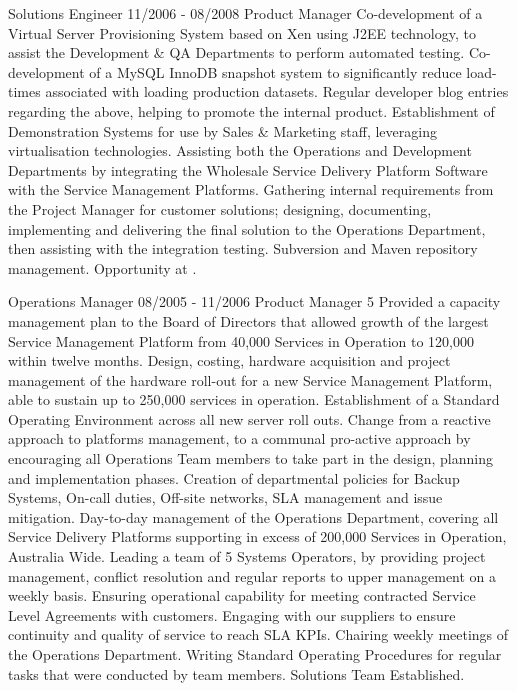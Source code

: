 \lskip
{} Solutions Engineer
 11/2006 - 08/2008
 Product Manager
 Co-development of a Virtual Server Provisioning System based on Xen using J2EE technology, to assist the Development \& QA Departments to perform automated testing.
\dashtopic Co-development of a MySQL InnoDB snapshot system to significantly reduce load-times associated with loading production datasets.
\dashtopic Regular developer blog entries regarding the above, helping to promote the internal product.
\dashtopic Establishment of Demonstration Systems for use by Sales \& Marketing staff, leveraging virtualisation technologies.
 Assisting both the Operations and Development Departments by integrating the Wholesale Service Delivery Platform Software with the Service Management Platforms.
\dashtopic Gathering internal requirements from the Project Manager for customer solutions; designing, documenting, implementing and delivering the final solution to the Operations Department, then assisting with the integration testing.
\dashtopic Subversion and Maven repository management.
 Opportunity at \ATL.
\pskip

 Operations Manager
\lskip
{} 08/2005 - 11/2006
 Product Manager
 5
 Provided a capacity management plan to the Board of Directors that allowed growth of the largest Service Management Platform from 40,000 Services in Operation to 120,000 within twelve months.
\dashtopic Design, costing, hardware acquisition and project management of the hardware roll-out for a new Service Management Platform, able to sustain up to 250,000 services in operation.
\dashtopic Establishment of a Standard Operating Environment across all new server roll outs.
\dashtopic Change from a reactive approach to platforms management, to a communal pro-active approach by encouraging all Operations Team members to take part in the design, planning and implementation phases.
\dashtopic Creation of departmental policies for Backup Systems, On-call duties, Off-site networks, SLA management and issue mitigation.
 Day-to-day management of the Operations Department, covering all Service Delivery Platforms supporting in excess of 200,000 Services in Operation, Australia Wide.
\dashtopic Leading a team of 5 Systems Operators, by providing project management, conflict resolution and regular reports to upper management on a weekly basis.
\dashtopic Ensuring operational capability for meeting contracted Service Level Agreements with customers.
\dashtopic Engaging with our suppliers to ensure continuity and quality of service to reach SLA KPIs.
\dashtopic Chairing weekly meetings of the Operations Department.
\dashtopic Writing Standard Operating Procedures for regular tasks that were conducted by team members.
 Solutions Team Established.
\pskip

